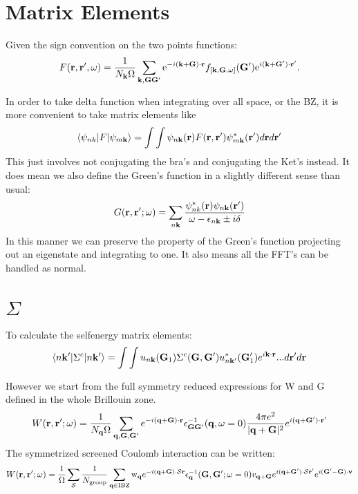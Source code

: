 \documentclass{article}
\def\r{{\bf r}}
\def\rp{{\bf r^\prime}}
\def\k{{\bf k}}
\def\q{{\bf q}}
\def\G{{\bf G}}
\def\Gp{{\bf G^\prime}}
\def\S{\mathcal{S}}
\def\bra{\langle}
\def\ket{\rangle}
\def\v{\mathbf{v}}
\def\w{\omega}
\begin{document}
\section{Matrix Elements}
Given the sign convention on the two points functions:
%
\begin{equation}\label{eq.fourier}
  F(\r,\rp,\w) = \frac{1}{N_\k\Omega}  \sum_{\k,\G\Gp} 
   {\rm e}^{-i(\k+\G)\cdot\r} 
    f_{[\k,\G,\w]}(\Gp)
   {\rm e}^{i(\k+\Gp)\cdot\rp}.
\end{equation}
%

In order to take delta function when integrating over all space, or the BZ, it is more convenient
to take matrix elements like
%
\begin{equation}
\bra \psi_{nk}|F|\psi_{m\k} \ket = \int\int \psi_{n\k}(\r)F(\r,\r')\psi_{m\k}^{*}(\r')d\r d\r'
\end{equation}
%
This just involves not conjugating the bra's and conjugating the Ket's instead. It does mean
we also define the Green's function in a slightly different sense than usual:
%
\begin{equation}
G(\r,\r';\omega) = \sum_{n\k}\frac{\psi^{*}_{nk}(\r)\psi_{n\k}(\r')}{\omega-\epsilon_{n\k} \pm i\delta}
\end{equation}
%
In this manner we can preserve the property of the Green's function projecting out an eigenstate and
integrating to one. It also means all the FFT's can be handled as normal.

\section{$\Sigma$}
To calculate the selfenergy matrix elements:
%
\begin{equation}
\bra n\k'|\Sigma^{c}|n\k'\ket = \int \int u_{n\k}(\G_{1})\Sigma^{c}(\G,\G')u^{*}_{n\k'}(\G_{1}')e^{i\k\cdot\r}...d\r'd\r
\end{equation}

However we start from the full symmetry reduced expressions for W and G defined in the whole Brillouin zone.
%
\begin{equation}
W(\r,\r';\omega) = \frac{1}{N_{\q}\Omega}\sum_{\q,\G,\G'}e^{-i(\q+\G)\cdot\r} \epsilon^{-1}_{\G\G'}(\q,\omega=0)\frac{4\pi e^{2}}{|\q+\G|^{2}} e^{i(\q+\G')\cdot\r'}
\end{equation}
%
The symmetrized screened Coulomb interaction can be written:
%
\begin{equation}
\label{eq:symmw2}
W(\r,\r';\omega) = \frac{1}{\Omega}\sum_{\S}\frac{1}{N_{\rm group}}\sum_{\q\in {\rm IBZ}}{\rm w_{\q}}e^{-i(\q+\G)\cdot\S\r}\epsilon^{-1}_{\q}(\G,\G';\omega=0)v_{\q+\G}e^{i(\q+\G')\cdot\S\r'}e^{i(\G'-\G)\cdot\v}
\end{equation}
\end{document}
